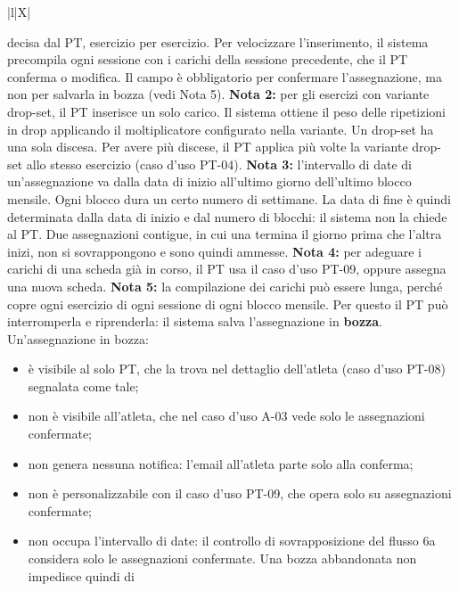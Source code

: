 \documentclass[../../../../SoftwareRequirementsSpecification.tex]{subfiles}
\begin{document}
\begin{xltabular}{\textwidth}{|l|X|}
{    decisa dal PT, esercizio per esercizio. Per velocizzare
    l'inserimento, il sistema precompila ogni sessione con i carichi
    della sessione precedente, che il PT conferma o modifica. Il
    campo è obbligatorio per confermare l'assegnazione, ma non per
    salvarla in bozza (vedi Nota 5).\newline
    \textbf{Nota 2:} per gli esercizi con variante drop-set, il PT
    inserisce un solo carico. Il sistema ottiene il peso delle
    ripetizioni in drop applicando il moltiplicatore configurato
    nella variante. Un drop-set ha una sola discesa. Per avere più
    discese, il PT applica più volte la variante drop-set allo stesso
    esercizio (caso d'uso PT-04).\newline
    \textbf{Nota 3:} l'intervallo di date di un'assegnazione va dalla
    data di inizio all'ultimo giorno dell'ultimo blocco mensile. Ogni
    blocco dura un certo numero di settimane. La data di fine è quindi
    determinata dalla data di inizio e dal numero di blocchi: il
    sistema non la chiede al PT. Due assegnazioni contigue, in cui
    una termina il giorno prima che l'altra inizi, non si sovrappongono
    e sono quindi ammesse.\newline
    \textbf{Nota 4:} per adeguare i carichi di una scheda già in
    corso, il PT usa il caso d'uso PT-09, oppure assegna una nuova
    scheda.\newline
    \textbf{Nota 5:} la compilazione dei carichi può essere lunga,
    perché copre ogni esercizio di ogni sessione di ogni blocco
    mensile. Per questo il PT può interromperla e riprenderla: il
    sistema salva l'assegnazione in \textbf{bozza}. Un'assegnazione
    in bozza:
    \begin{itemize}
      \item è visibile al solo PT, che la trova nel dettaglio
        dell'atleta (caso d'uso PT-08) segnalata come tale;
      \item non è visibile all'atleta, che nel caso d'uso A-03 vede
        solo le assegnazioni confermate;
      \item non genera nessuna notifica: l'email all'atleta parte
        solo alla conferma;
      \item non è personalizzabile con il caso d'uso PT-09, che
        opera solo su assegnazioni confermate;
      \item non occupa l'intervallo di date: il controllo di
        sovrapposizione del flusso 6a considera solo le assegnazioni
        confermate. Una bozza abbandonata non impedisce quindi di

\end{itemize}}
\end{xltabular}
\end{document}
